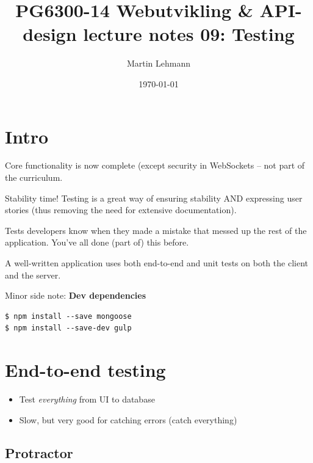 \documentclass[british]{article}
\title{PG6300-14 Webutvikling \& API-design lecture notes 09: Testing}
\author{Martin Lehmann}
\date{\today}
\begin{document}
\maketitle

\section{Intro}
Core functionality is now complete (except security in WebSockets -- not part of the curriculum.

Stability time! Testing is a great way of ensuring stability AND expressing user stories (thus removing the need for extensive documentation).

Tests developers know when they made a mistake that messed up the rest of the application. You've all done (part of) this before.

A well-written application uses both end-to-end and unit tests on both the client and the server.

Minor side note: \textbf{Dev dependencies}

\begin{lstlisting}
$ npm install --save mongoose
$ npm install --save-dev gulp
\end{lstlisting}

\section{End-to-end testing}

\begin{itemize}
  \item Test \textit{everything} from UI to database
  \item Slow, but very good for catching errors (catch everything)
\end{itemize}

\subsection{Protractor}
\end{document}
